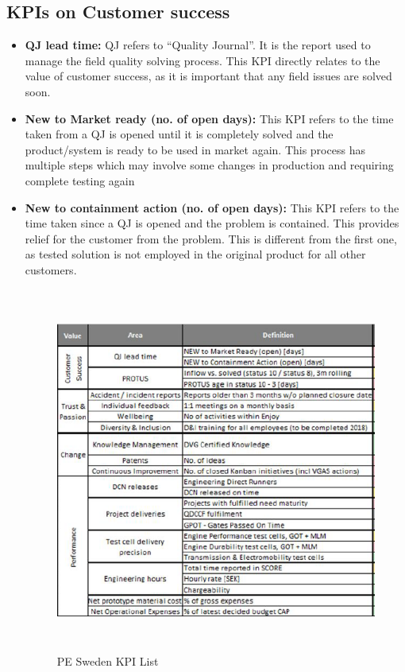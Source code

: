 \subsection{KPIs on Customer success}
\begin{itemize}
    \item \textbf{QJ lead time:} QJ refers to “Quality Journal”. It is the report used to manage the field quality solving process. This KPI directly relates to the value of customer success, as it is important that any field issues are solved soon.\\ 


     \item \textbf{New to Market ready (no. of open days):}
    This KPI refers to the time taken from a QJ is opened until it is completely solved and the product/system is ready to be used in market again. This process has multiple steps which may involve some changes in production and requiring complete testing again \\

     \item \textbf{New to containment action (no. of open days):}
    This KPI refers to the time taken since a QJ is opened and the problem is contained. This provides relief for the customer from the problem. This is different from the first one, as tested solution is not employed in the original product for all other customers.\\
    
    \begin{figure}[H]
    \centering
    \captionsetup{justification=centering, margin=2cm}
    \vspace{1cm}
    \includegraphics[width=14cm, height=12cm]{figure/auxiliary/fig51.PNG}
    \caption{ PE Sweden KPI List}
    \label{fig:5.1}
\end{figure}



\end{itemize}
